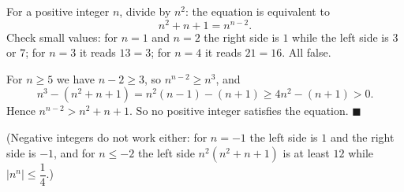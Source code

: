 For a positive integer $n$, divide by $n^2$: the equation is equivalent to
\[
n^2+n+1=n^{n-2}.
\]
Check small values: for $n=1$ and $n=2$ the right side is $1$ while the left side is $3$ or $7$; for $n=3$ it reads $13=3$; for $n=4$ it reads $21=16$. All false.

For $n\ge5$ we have $n-2\ge3$, so $n^{n-2}\ge n^3$, and
\[
n^3-(n^2+n+1)=n^2(n-1)-(n+1)\ge4n^2-(n+1)>0 .
\]
Hence $n^{n-2}>n^2+n+1$. So no positive integer satisfies the equation. $\blacksquare$

(Negative integers do not work either: for $n=-1$ the left side is $1$ and the right side is $-1$, and for $n\le-2$ the left side $n^2(n^2+n+1)$ is at least $12$ while $\left|n^n\right|\le\dfrac{1}{4}$.)
